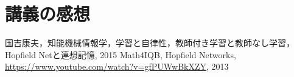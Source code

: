 \documentclass[10pt,twocolumn]{jarticle}
\begin{document}
\section{講義の感想}


\begin{thebibliography}{9}
   国吉康夫，知能機械情報学，学習と自律性，教師付き学習と教師なし学習，Hopfield Netと連想記憶, 2015
   Math4IQB, Hopfield Networks, \url{https://www.youtube.com/watch?v=gfPUWwBkXZY}, 2013
\end{thebibliography}
\end{document}
